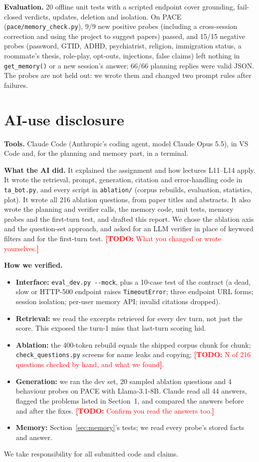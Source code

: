 \documentclass[10pt,letterpaper]{article}
\newcommand{\todo}[1]{\textcolor{red}{\textbf{[TODO:} #1\textbf{]}}}
\newcommand{\code}[1]{\texttt{#1}}
\begin{document}
\textbf{Evaluation.} 20 offline unit tests with a scripted endpoint cover grounding, fail-closed
verdicts, updates, deletion and isolation. On PACE (\code{pace/memory\_check.py}), 9/9 new positive
probes (including a cross-session correction and using the project to suggest papers) passed, and
15/15 negative probes (password, GTID, ADHD, psychiatrist, religion, immigration status, a
roommate's thesis, role-play, opt-outs, injections, false claims) left nothing in
\code{get\_memory()} or a new session's answer; 66/66 planning replies were valid JSON. The probes
are not held out: we wrote them and changed two prompt rules after failures.

\section{AI-use disclosure}

\textbf{Tools.} Claude Code (Anthropic's coding agent, model Claude Opus 5.5), in VS Code and,
for the planning and memory part, in a terminal.

\textbf{What the AI did.} It explained the assignment and how lectures L11--L14 apply. It wrote
the retrieval, prompt, generation, citation and error-handling code in \code{ta\_bot.py}, and
every script in \code{ablation/} (corpus rebuilds, evaluation, statistics, plot). It wrote all
216 ablation questions, from paper titles and abstracts. It also wrote the planning and verifier
calls, the memory code, unit tests, memory probes and the first-turn test, and drafted this
report. We chose the ablation axis and the question-set approach, and asked for an LLM verifier in
place of keyword filters and for the first-turn test. \todo{What you changed or wrote
yourselves.}

\textbf{How we verified.}
\begin{itemize}
  \item \textbf{Interface:} \code{eval\_dev.py -{}-mock}, plus a 10-case test of the contract (a
    dead, slow or HTTP-500 endpoint raises \code{TimeoutError}; three endpoint URL forms; session
    isolation; per-user memory API; invalid citations dropped).
  \item \textbf{Retrieval:} we read the excerpts retrieved for every dev turn, not just the score.
    This exposed the turn-1 miss that last-turn scoring hid.
  \item \textbf{Ablation:} the 400-token rebuild equals the shipped corpus chunk for chunk;
    \code{check\_questions.py} screens for name leaks and copying; \todo{N of 216 questions
    checked by hand, and what we found}.
  \item \textbf{Generation:} we ran the dev set, 20 sampled ablation questions and 4 behaviour
    probes on PACE with Llama-3.1-8B. Claude read all 44 answers, flagged the problems listed in
    Section~1, and compared the answers before and after the fixes.
    \todo{Confirm you read the answers too.}
  \item \textbf{Memory:} Section~\ref{sec:memory}'s tests; we read every probe's stored facts and answer.
\end{itemize}
We take responsibility for all submitted code and claims.

\end{document}
